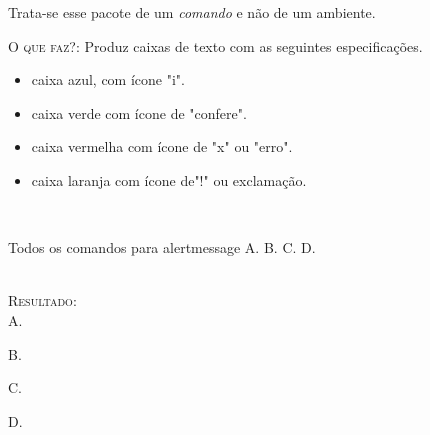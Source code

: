 Trata-se esse pacote de um \textit{comando} e não de um ambiente.

\textsc{O que faz?}: Produz caixas de texto com as seguintes especificações.

\begin{itemize}
\item caixa azul, com ícone "i".
\item caixa verde com ícone de "confere".
\item caixa vermelha com ícone de "x" ou "erro".
\item caixa laranja com ícone de"!" ou exclamação.
\end{itemize}
\ \\

\begin{codex}{Todos os comandos para alertmessage}
	A. 
	B. 
	C. 
	D. 
\end{codex}
\ \\

\textsc{Resultado:}
\ \\

A. 

B. 

C. 

D. 